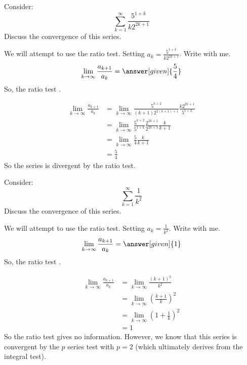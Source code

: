 \documentclass{ximera}
\begin{document}
\begin{example}
  Consider:
  \[
  \sum_{k=1}^\infty \frac{5^{1+k}}{k 2^{2k+1}}
  \]
  Discuss the convergence of this series.
  \begin{explanation}
    We will attempt to use the ratio test. Setting $a_k =
    \frac{5^{1+k}}{k 2^{2k+1}}$.  Write with me.
    \[
    \lim_{k \to \infty} \frac{a_{k+1}}{a_k} = \answer[given]{\frac{5}{4}}
    \]
    So, the ratio test
    . 
    \begin{hint}
      \begin{align*}
	\lim_{k \to \infty} \frac{a_{k+1}}{a_k} &= \lim_{k \to \infty} \frac{5^{k+2}}{(k+1)2^{2(k+1)+1}} \frac{k 2^{2k+1}}{5^{1+k}}\\
	&=\lim_{k \to \infty} \frac{5^{k+2}}{5^{1+k}} \frac{2^{2k+1}}{2^{2k+3}} \frac{k}{k+1}\\
	&=\lim_{k \to \infty} \frac{5}{4} \frac{k}{k+1}\\
	&=\frac{5}{4}
      \end{align*}	
      So the series is divergent by the ratio test.
    \end{hint}
  \end{explanation}
\end{example}


\begin{example}
  Consider:	
  \[
  \sum_{k=1}^\infty \frac{1}{k^2}
  \]
  Discuss the convergence of this series.
  \begin{explanation}
    We will attempt to use the ratio test. Setting $a_k =
    \frac{1}{k^2}$. Write with me.
    \[ 
    \lim_{k \to \infty} \frac{a_{k+1}}{a_k} = \answer[given]{1}	
    \]
    So, the ratio test
    .		
    \begin{hint}
      \begin{align*}
	\lim_{k \to \infty} \frac{a_{k+1}}{a_k} &= \lim_{k \to \infty} \frac{(k+1)^2}{k^2}\\
	&= \lim_{k \to \infty} \left( \frac{k+1}{k}\right)^2\\
	&= \lim_{k \to \infty} \left( 1+\frac{1}{k}\right)^2\\
	&= 1
      \end{align*}
      So the ratio test gives no information.  However, we know that
      this series is convergent by the $p$ series test with $p=2$
      (which ultimately derives from the integral test).
    \end{hint}
  \end{explanation}
\end{example}
\end{document}
